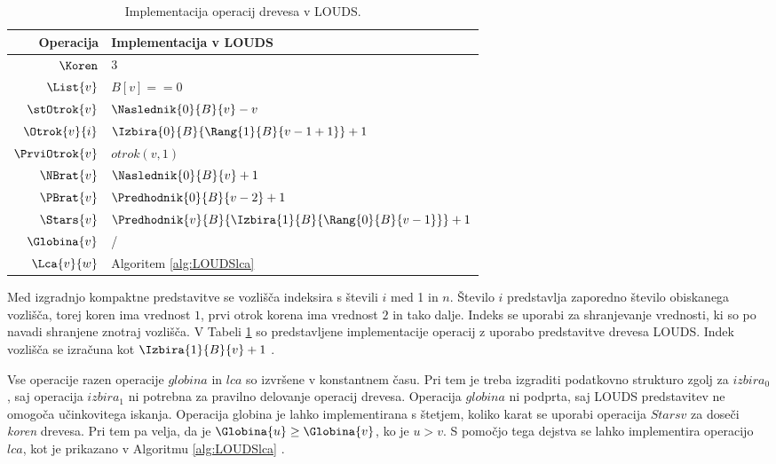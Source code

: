 \begin{table}[htb]
    \centering
    \caption{Implementacija operacij drevesa v LOUDS.}
    \begin{tabular}{r|l}
\textbf{Operacija}& \textbf{Implementacija v LOUDS} \\\hline
         $\Koren$ &         3\\
         $\List{v}$ &       $B[v]==0$\\
         $\stOtrok{v}$&     $\Naslednik{0}{B}{v}-v$\\
         $\Otrok{v}{i}$ &   $\Izbira{0}{B}{\Rang{1}{B}{v-1+1}}+1$\\
         $\PrviOtrok{v}$&   $otrok(v,1)$\\
         $\NBrat{v}$ &      $\Naslednik{0}{B}{v}+1$ \\
         $\PBrat{v}$ &      $\Predhodnik{0}{B}{v-2}+1$ \\
         $\Stars{v}$ &      $\Predhodnik{v}{B}{\Izbira{1}{B}{\Rang{0}{B}{v-1}}}+1$ \\
         $\Globina{v}$ &        / \\
         $\Lca{v}{w}$ &     Algoritem \ref{alg:LOUDSlca}\\

    \end{tabular}
    \label{tab:LOUDSop}
\end{table}

Med izgradnjo kompaktne predstavitve se vozlišča indeksira s števili $i$ med 1 in $n$. Število $i$ predstavlja zaporedno število obiskanega vozlišča, torej koren ima vrednost $1$, prvi otrok korena ima vrednost $2$ in tako dalje. Indeks se uporabi za shranjevanje vrednosti, ki so po navadi shranjene znotraj vozlišča. V Tabeli \ref{tab:LOUDSop} so predstavljene implementacije operacij z uporabo predstavitve drevesa LOUDS. Indek vozlišča se izračuna kot $\Izbira{1}{B}{v}+1$ \cite{Navarro2016}.


Vse operacije razen operacije $globina$ in $lca$ so izvršene v konstantnem času. Pri tem je treba izgraditi podatkovno strukturo zgolj za $izbira_0$, saj operacija $izbira_1$ ni potrebna za pravilno delovanje operacij drevesa. Operacija $globina$ ni podprta, saj LOUDS predstavitev ne omogoča učinkovitega iskanja. Operacija globina je lahko implementirana s štetjem, koliko karat se uporabi operacija $Stars{v}$ za doseči \textit{koren} drevesa. Pri tem  pa velja, da je $\Globina{u}\ge\Globina{v}$, ko je $u>v$. S pomočjo tega dejstva se lahko implementira operacijo $lca$, kot je prikazano v Algoritmu \ref{alg:LOUDSlca} \cite{Navarro2016}.
 

